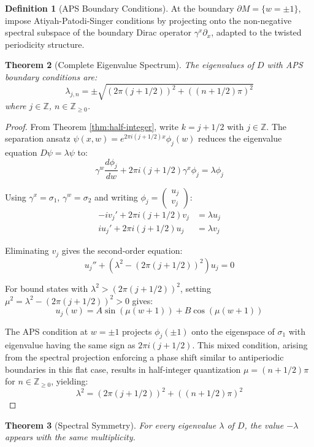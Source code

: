\documentclass[11pt]{amsart}
\newtheorem{theorem}{Theorem}[section]
\theoremstyle{definition}
\newtheorem{definition}[theorem]{Definition}
\theoremstyle{remark}
\newcommand{\ZZ}{\mathbb{Z}}
\begin{document}
\begin{definition}[APS Boundary Conditions]\label{def:aps}
At the boundary $\partial M = \{w = \pm 1\}$, impose Atiyah-Patodi-Singer conditions by projecting onto the non-negative spectral subspace of the boundary Dirac operator $\gamma^x \partial_x$, adapted to the twisted periodicity structure.
\end{definition}

\begin{theorem}[Complete Eigenvalue Spectrum]\label{thm:complete-spectrum}
The eigenvalues of $D$ with APS boundary conditions are:
\[
\lambda_{j,n} = \pm\sqrt{(2\pi(j + 1/2))^2 + ((n + 1/2)\pi)^2}
\]
where $j \in \ZZ$, $n \in \ZZ_{\geq 0}$.
\end{theorem}

\begin{proof}
From Theorem \ref{thm:half-integer}, write $k = j + 1/2$ with $j \in \ZZ$. The separation ansatz $\psi(x,w) = e^{2\pi i(j+1/2)x}\phi_j(w)$ reduces the eigenvalue equation $D\psi = \lambda\psi$ to:
\[
\gamma^w \frac{d\phi_j}{dw} + 2\pi i(j+1/2)\gamma^x \phi_j = \lambda \phi_j
\]

Using $\gamma^x = \sigma_1$, $\gamma^w = \sigma_2$ and writing $\phi_j = \begin{pmatrix} u_j \\ v_j \end{pmatrix}$:
\begin{align}
-iv_j' + 2\pi i(j+1/2)v_j &= \lambda u_j \\
iu_j' + 2\pi i(j+1/2)u_j &= \lambda v_j
\end{align}

Eliminating $v_j$ gives the second-order equation:
\[
u_j'' + (\lambda^2 - (2\pi(j+1/2))^2)u_j = 0
\]

For bound states with $\lambda^2 > (2\pi(j+1/2))^2$, setting $\mu^2 = \lambda^2 - (2\pi(j+1/2))^2 > 0$ gives:
\[
u_j(w) = A\sin(\mu(w+1)) + B\cos(\mu(w+1))
\]

The APS condition at $w=\pm 1$ projects $\phi_j(\pm 1)$ onto the eigenspace of $\sigma_1$ with eigenvalue having the same sign as $2\pi i(j+1/2)$. This mixed condition, arising from the spectral projection enforcing a phase shift similar to antiperiodic boundaries in this flat case, results in half-integer quantization $\mu = (n+1/2)\pi$ for $n \in \ZZ_{\geq 0}$, yielding:
\[
\lambda^2 = (2\pi(j+1/2))^2 + ((n+1/2)\pi)^2
\]
\end{proof}

\begin{theorem}[Spectral Symmetry]\label{thm:spectral-symmetry}
For every eigenvalue $\lambda$ of $D$, the value $-\lambda$ appears with the same multiplicity.
\end{theorem}
\end{document}
